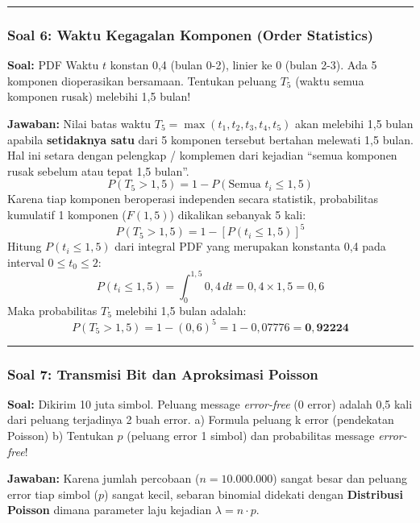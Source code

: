 \documentclass[
  letterpaper,
  DIV=11,
  numbers=noendperiod]{scrartcl}
\begin{document}
\begin{center}\rule{0.5\linewidth}{0.5pt}\end{center}

\subsubsection{\texorpdfstring{\textbf{Soal 6: Waktu Kegagalan Komponen
(Order
Statistics)}}{Soal 6: Waktu Kegagalan Komponen (Order Statistics)}}\label{soal-6-waktu-kegagalan-komponen-order-statistics}

\textbf{Soal:} PDF Waktu \(t\) konstan 0,4 (bulan 0-2), linier ke 0
(bulan 2-3). Ada 5 komponen dioperasikan bersamaan. Tentukan peluang
\(T_5\) (waktu semua komponen rusak) melebihi 1,5 bulan!

\textbf{Jawaban:} Nilai batas waktu
\(T_5 = \max(t_1, t_2, t_3, t_4, t_5)\) akan melebihi 1,5 bulan apabila
\textbf{setidaknya satu} dari 5 komponen tersebut bertahan melewati 1,5
bulan. Hal ini setara dengan pelengkap / komplemen dari kejadian ``semua
komponen rusak sebelum atau tepat 1,5 bulan''.
\[ P(T_5 > 1,5) = 1 - P(\text{Semua } t_i \le 1,5) \] Karena tiap
komponen beroperasi independen secara statistik, probabilitas kumulatif
1 komponen (\(F(1,5)\)) dikalikan sebanyak 5 kali:
\[ P(T_5 > 1,5) = 1 - [P(t_i \le 1,5)]^5 \] Hitung \(P(t_i \le 1,5)\)
dari integral PDF yang merupakan konstanta 0,4 pada interval
\(0 \le t_0 \le 2\):
\[ P(t_i \le 1,5) = \int_{0}^{1,5} 0,4 \, dt = 0,4 \times 1,5 = 0,6 \]
Maka probabilitas \(T_5\) melebihi 1,5 bulan adalah:
\[ P(T_5 > 1,5) = 1 - (0,6)^5 = 1 - 0,07776 = \mathbf{0,92224} \]

\begin{center}\rule{0.5\linewidth}{0.5pt}\end{center}

\subsubsection{\texorpdfstring{\textbf{Soal 7: Transmisi Bit dan
Aproksimasi
Poisson}}{Soal 7: Transmisi Bit dan Aproksimasi Poisson}}\label{soal-7-transmisi-bit-dan-aproksimasi-poisson}

\textbf{Soal:} Dikirim 10 juta simbol. Peluang message \emph{error-free}
(0 error) adalah 0,5 kali dari peluang terjadinya 2 buah error. a)
Formula peluang k error (pendekatan Poisson) b) Tentukan \(p\) (peluang
error 1 simbol) dan probabilitas message \emph{error-free}!

\textbf{Jawaban:} Karena jumlah percobaan (\(n = 10.000.000\)) sangat
besar dan peluang error tiap simbol (\(p\)) sangat kecil, sebaran
binomial didekati dengan \textbf{Distribusi Poisson} dimana parameter
laju kejadian \(\lambda = n \cdot p\).
\end{document}
